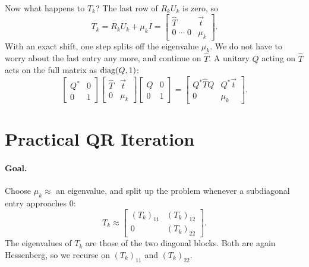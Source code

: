 Now what happens to $T_k$? The last row of $R_kU_k$ is zero, so
\begin{equation}
  T_k = R_kU_k + \mu_kI = \begin{bmatrix} \hat{T} & \vec{t} \\ 0 \;\cdots\; 0 & \mu_k \end{bmatrix}.
\end{equation}
With an exact shift, one step splits off the eigenvalue $\mu_k$. We do not have to worry about the last entry any more, and continue on $\hat{T}$. A unitary $Q$ acting on $\hat{T}$ acts on the full matrix as $\operatorname{diag}(Q, 1)$:
\begin{equation}
  \begin{bmatrix} Q^\ast & 0 \\ 0 & 1 \end{bmatrix}
  \begin{bmatrix} \hat{T} & \vec{t} \\ 0 & \mu_k \end{bmatrix}
  \begin{bmatrix} Q & 0 \\ 0 & 1 \end{bmatrix}
  = \begin{bmatrix} Q^\ast\hat{T}Q & Q^\ast\vec{t} \\ 0 & \mu_k \end{bmatrix}.
\end{equation}

\section{Practical QR Iteration}
\label{sec:practical-qr}

\paragraph{Goal.} Choose $\mu_k \approx$ an eigenvalue, and split up the problem whenever a subdiagonal entry approaches $0$:
\begin{equation}
  T_k \approx \begin{bmatrix} (T_k)_{11} & (T_k)_{12} \\ 0 & (T_k)_{22} \end{bmatrix}.
\end{equation}
The eigenvalues of $T_k$ are those of the two diagonal blocks. Both are again Hessenberg, so we recurse on $(T_k)_{11}$ and $(T_k)_{22}$.

